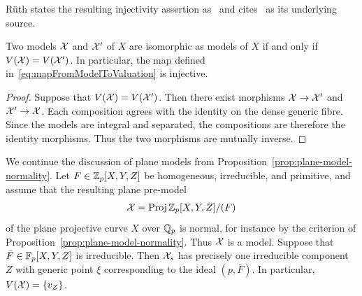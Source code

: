 Rüth states the resulting injectivity assertion as~\cite[Proposition 3.9]{Rueth} and cites~\cite[Corollary 8.3.23]{Liu} as its underlying source.

\begin{corollary}
    Two models $\mathcal X$ and $\mathcal X'$ of $X$ are isomorphic as models of $X$ if and only if $V(\mathcal X) = V(\mathcal X')$.
    In particular, the map defined in~\eqref{eq:mapFromModelToValuation} is injective.
\end{corollary}

\begin{proof}
    Suppose that $V(\mathcal X) = V(\mathcal X')$.
    Then there exist morphisms $\mathcal X\to \mathcal X'$ and $\mathcal X' \to \mathcal X$.
    Each composition agrees with the identity on the dense generic fibre.
    Since the models are integral and separated, the compositions are therefore the identity morphisms.
    Thus the two morphisms are mutually inverse.
\end{proof}

\begin{example}
    We continue the discussion of plane models from Proposition~\ref{prop:plane-model-normality}.
    Let $F\in \mathbb Z_p[X,Y,Z]$ be homogeneous, irreducible, and primitive, and assume that the resulting plane pre-model
    \begin{align}
        \mathcal X = \operatorname{Proj}{\mathbb Z_p[X,Y,Z]/(F)}
    \end{align}
    of the plane projective curve $X$ over $\mathbb Q_p$ is normal, for instance by the criterion of Proposition~\ref{prop:plane-model-normality}.
    Thus $\mathcal X$ is a model.
    Suppose that $\bar{F} \in \mathbb F_p[X,Y,Z]$ is irreducible.
    Then $\mathcal X_s$ has precisely one irreducible component $Z$
    with generic point $\xi$ corresponding to the ideal $(p, \bar{F})$.
    In particular, $V(\mathcal X) = \lbrace v_Z\rbrace$.
\end{example}

